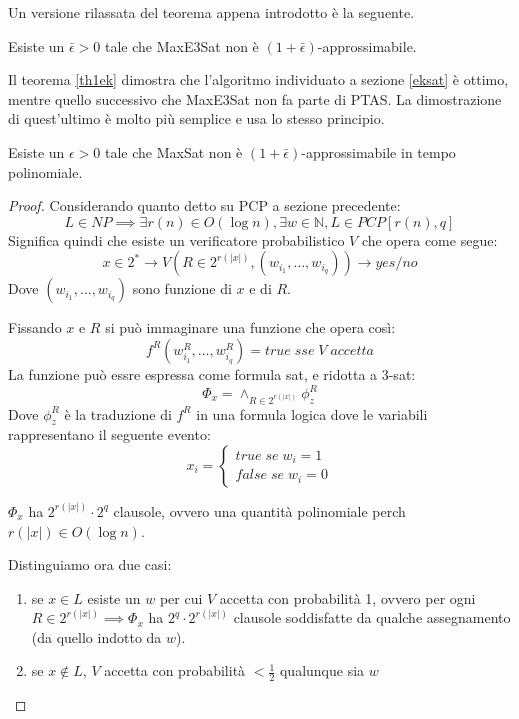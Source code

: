 Un versione rilassata del teorema appena introdotto è la seguente.
\begin{theorem}
    Esiste un $\bar{\epsilon} > 0$ tale che MaxE3Sat non è $(1+\bar{\epsilon})$-approssimabile. 
\end{theorem}
\begin{remark}
    Il teorema \ref{th1ek} dimostra che l'algoritmo individuato a sezione \ref{eksat} è ottimo, 
    mentre quello successivo che MaxE3Sat non fa parte di PTAS. La dimostrazione di quest'ultimo è
    molto più semplice e usa lo stesso principio.
\end{remark}
\begin{lemma}
    Esiste un $\epsilon > 0$ tale che MaxSat non è $(1+\bar{\epsilon})$-approssimabile in tempo polinomiale.
\end{lemma}
\begin{proof}
    Considerando quanto detto su PCP a sezione precedente: 
    $$L \in NP \implies \exists r(n) \in O(\log n), \exists w \in \mathbb{N}, L \in PCP[r(n), q]$$
    Significa quindi che esiste un verificatore probabilistico $V$ che opera come segue:
    $$x \in 2^* \longrightarrow V (R \in 2^{r(|x|)}, (w_{i_1}, \dots, w_{i_q})) \longrightarrow \mathit{yes}/\mathit{no}$$
    Dove $(w_{i_1}, \dots, w_{i_q})$ sono funzione di $x$ e di $R$.
    
    Fissando $x$ e $R$ si può immaginare una funzione che opera così:
    $$f^R(w_{i_1}^R, \dots, w_{i_q}^R) = \mathit{true\;sse\;V\;accetta}$$
    La funzione può essre espressa come formula sat, e ridotta a 3-sat:
    $$\Phi_x = \wedge_{R\in 2^{r(|x|)}} \phi_z^R$$
    Dove $\phi_z^R$ è la traduzione di $f^R$ in una formula logica dove le 
    variabili rappresentano il seguente evento:
    \[
        x_i = \begin{cases}
            \mathit{true\;se\;} w_i = 1\\
            \mathit{false\;se\;} w_i = 0
        \end{cases}\]

    $\Phi_x$ ha $2^{r(|x|)} \cdot 2^q$ clausole, ovvero una quantità polinomiale perch
    $r(|x|) \in O(\log n)$.

    Distinguiamo ora due casi:
    \begin{enumerate}
        \item se $x \in L$ esiste un $w$ per cui $V$ accetta con probabilità 1, 
        ovvero per ogni $R \in 2^{r(|x|)} \implies \Phi_x$ ha $2^q\cdot 2^{r(|x|)}$
        clausole soddisfatte da qualche assegnamento (da quello indotto da $w$).
        \item se $x \notin L$, $V$ accetta con probabilità $< \frac{1}{2}$ 
        qualunque sia $w$
    \end{enumerate}


\end{proof}
